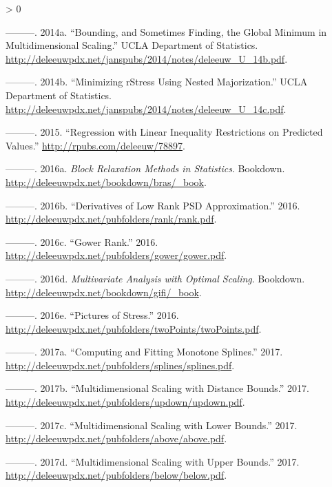 \documentclass[
  12pt,
]{book}
\newlength{\cslhangindent}
\newenvironment{CSLReferences}[2] %
 {%
  \setlength{\parindent}{0pt}
  \ifodd #1 \everypar{\setlength{\hangindent}{\cslhangindent}}\ignorespaces\fi
  \ifnum #2 > 0
  \setlength{\parskip}{#2\baselineskip}
  \fi
 }%
 {}
\theoremstyle{definition}
\theoremstyle{definition}
\theoremstyle{definition}
\theoremstyle{definition}
\theoremstyle{remark}
\begin{document}
\begin{CSLReferences}{1}{0}
\leavevmode\hypertarget{ref-deleeuw_U_14b}{}%
---------. 2014a. {``{Bounding, and Sometimes Finding, the Global Minimum in Multidimensional Scaling}.''} UCLA Department of Statistics. \url{http://deleeuwpdx.net/janspubs/2014/notes/deleeuw_U_14b.pdf}.

\leavevmode\hypertarget{ref-deleeuw_U_14c}{}%
---------. 2014b. {``{Minimizing rStress Using Nested Majorization}.''} UCLA Department of Statistics. \url{http://deleeuwpdx.net/janspubs/2014/notes/deleeuw_U_14c.pdf}.

\leavevmode\hypertarget{ref-deleeuw_E_15e}{}%
---------. 2015. {``Regression with Linear Inequality Restrictions on Predicted Values.''} \url{http://rpubs.com/deleeuw/78897}.

\leavevmode\hypertarget{ref-deleeuw_B_16b}{}%
---------. 2016a. \emph{Block Relaxation Methods in Statistics}. Bookdown. \url{http://deleeuwpdx.net/bookdown/bras/_book}.

\leavevmode\hypertarget{ref-deleeuw_E_16p}{}%
---------. 2016b. {``{Derivatives of Low Rank PSD Approximation}.''} 2016. \url{http://deleeuwpdx.net/pubfolders/rank/rank.pdf}.

\leavevmode\hypertarget{ref-deleeuw_E_16k}{}%
---------. 2016c. {``Gower Rank.''} 2016. \url{http://deleeuwpdx.net/pubfolders/gower/gower.pdf}.

\leavevmode\hypertarget{ref-deleeuw_B_16a}{}%
---------. 2016d. \emph{Multivariate Analysis with Optimal Scaling}. Bookdown. \url{http://deleeuwpdx.net/bookdown/gifi/_book}.

\leavevmode\hypertarget{ref-deleeuw_E_16l}{}%
---------. 2016e. {``Pictures of Stress.''} 2016. \url{http://deleeuwpdx.net/pubfolders/twoPoints/twoPoints.pdf}.

\leavevmode\hypertarget{ref-deleeuw_E_17i}{}%
---------. 2017a. {``{Computing and Fitting Monotone Splines}.''} 2017. \url{http://deleeuwpdx.net/pubfolders/splines/splines.pdf}.

\leavevmode\hypertarget{ref-deleeuw_E_17d}{}%
---------. 2017b. {``{Multidimensional Scaling with Distance Bounds}.''} 2017. \url{http://deleeuwpdx.net/pubfolders/updown/updown.pdf}.

\leavevmode\hypertarget{ref-deleeuw_E_17c}{}%
---------. 2017c. {``{Multidimensional Scaling with Lower Bounds}.''} 2017. \url{http://deleeuwpdx.net/pubfolders/above/above.pdf}.

\leavevmode\hypertarget{ref-deleeuw_E_17b}{}%
---------. 2017d. {``{Multidimensional Scaling with Upper Bounds}.''} 2017. \url{http://deleeuwpdx.net/pubfolders/below/below.pdf}.


\end{CSLReferences}
\end{document}

